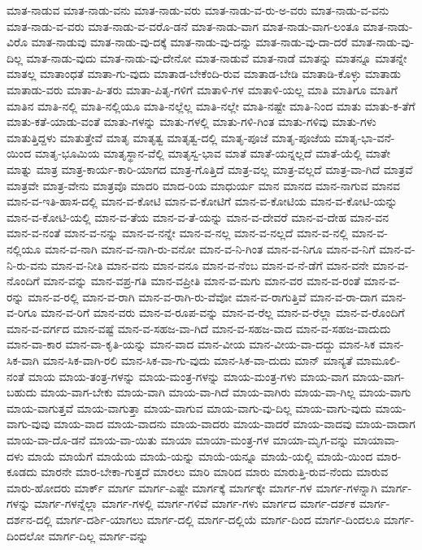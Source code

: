 {ಮಾತ-ನಾಡುವ
ಮಾತ-ನಾಡು-ವನು
ಮಾತ-ನಾಡು-ವರು
ಮಾತ-ನಾಡು-ವ-ರು-ಅ-ವರು
ಮಾತ-ನಾಡು-ವ-ವನು
ಮಾತ-ನಾಡು-ವ-ವರು
ಮಾತ-ನಾಡು-ವ-ವರೊ-ಡನೆ
ಮಾತ-ನಾಡು-ವಾಗ
ಮಾತ-ನಾಡು-ವಾಗ-ಲಂತೂ
ಮಾತ-ನಾಡು-ವಿರೊ
ಮಾತ-ನಾಡುವು
ಮಾತ-ನಾಡು-ವು-ದಕ್ಕೆ
ಮಾತ-ನಾಡು-ವು-ದನ್ನು
ಮಾತ-ನಾಡು-ವು-ದಾ-ದರೆ
ಮಾತ-ನಾಡು-ವು-ದಿಲ್ಲ
ಮಾತ-ನಾಡು-ವುದು
ಮಾತ-ನಾಡು-ವು-ದೇನೋ
ಮಾತ-ನಾಡುವೆ
ಮಾತ-ನಾಡೆ
ಮಾತನ್ನು
ಮಾತನ್ನೂ
ಮಾತನ್ನೇ
ಮಾತಲ್ಲ
ಮಾತಾಂಧತೆ
ಮಾತಾ-ಗು-ವುದು
ಮಾತಾಡ-ಬೇಕೆಂದಿ-ರುವ
ಮಾತಾಡ-ಬೇಡಿ
ಮಾತಾಡಿ-ಕೊಳ್ಳು
ಮಾತಾಡು
ಮಾತಾಡು-ವರು
ಮಾತಾ-ಪಿ-ತರು
ಮಾತಾ-ಪಿತೃ-ಗಳಿಗೆ
ಮಾತಾಳಿ-ಗಳ
ಮಾತಾಳಿ-ಯಲ್ಲ
ಮಾತಿ
ಮಾತಿಗೂ
ಮಾತಿಗೆ
ಮಾತಿನ
ಮಾತಿ-ನಲ್ಲಿ
ಮಾತಿ-ನಲ್ಲಿಯೂ
ಮಾತಿ-ನಲ್ಲೆಲ್ಲ
ಮಾತಿ-ನಲ್ಲೇ
ಮಾತಿ-ನಷ್ಟೇ
ಮಾತಿ-ನಿಂದ
ಮಾತು
ಮಾತು-ಕ-ತೆಗೆ
ಮಾತು-ಕತೆ-ಯಾಡು-ವಂತೆ
ಮಾತು-ಗಳನ್ನು
ಮಾತು-ಗಳಲ್ಲಿ
ಮಾತು-ಗಳಿ-ಗಿಂತ
ಮಾತು-ಗಳಿವು
ಮಾತು-ಗಳು
ಮಾತುತ್ತಿದ್ದಳು
ಮಾತುತ್ತೇವೆ
ಮಾತೃ
ಮಾತೃತ್ವ
ಮಾತೃತ್ವ-ದಲ್ಲಿ
ಮಾತೃ-ಪೂಜೆ
ಮಾತೃ-ಪೂಜೆಯ
ಮಾತೃ-ಭಾ-ವನೆ-ಯಿಂದ
ಮಾತೃ-ಭೂಮಿಯ
ಮಾತೃಸ್ಥಾನ-ವೆಲ್ಲಿ
ಮಾತೃಸ್ವ-ಭಾವ
ಮಾತೆ
ಮಾತೆ-ಯನ್ನಲ್ಲದೆ
ಮಾತೆ-ಯೆಲ್ಲಿ
ಮಾತೇ
ಮಾತ್ನು
ಮಾತ್ರ
ಮಾತ್ರ-ಕಾರ್ಯ-ಕಾರಿ-ಯಾಗದ
ಮಾತ್ರ-ಗೊತ್ತಿದೆ
ಮಾತ್ರ-ವಲ್ಲ
ಮಾತ್ರ-ವಲ್ಲದೆ
ಮಾತ್ರ-ವಾ-ಗಿದೆ
ಮಾತ್ರವೆ
ಮಾತ್ರವೇ
ಮಾತ್ರ-ವೇನು
ಮಾತ್ರವೊ
ಮಾದರಿ
ಮಾದ-ರಿಯ
ಮಾಧುರ್ಯ
ಮಾನ
ಮಾನದ
ಮಾನ-ನಾಗುವ
ಮಾನವ
ಮಾನ-ವ-ಇತಿ-ಹಾಸ-ದಲ್ಲಿ
ಮಾನ-ವ-ಕೋಟಿ
ಮಾನ-ವ-ಕೋಟಿಗೆ
ಮಾನ-ವ-ಕೋಟಿಯ
ಮಾನ-ವ-ಕೋಟಿ-ಯನ್ನು
ಮಾನ-ವ-ಕೋಟಿ-ಯಲ್ಲಿ
ಮಾನ-ವ-ತೆಯ
ಮಾನ-ವ-ತೆ-ಯನ್ನು
ಮಾನ-ವ-ದೇವರೆ
ಮಾನ-ವ-ದೇಹ
ಮಾನ-ವನ
ಮಾನ-ವ-ನಂತೆ
ಮಾನ-ವ-ನನ್ನು
ಮಾನ-ವ-ನನ್ನೇ
ಮಾನ-ವ-ನಲ್ಲ
ಮಾನ-ವ-ನಲ್ಲದೆ
ಮಾನ-ವ-ನಲ್ಲಿ
ಮಾನ-ವ-ನಲ್ಲಿಯೂ
ಮಾನ-ವ-ನಾಗಿ
ಮಾನ-ವ-ನಾಗಿ-ರು-ವನೋ
ಮಾನ-ವ-ನಿ-ಗಿಂತ
ಮಾನ-ವ-ನಿಗೂ
ಮಾನ-ವ-ನಿಗೆ
ಮಾನ-ವ-ನಿ-ರು-ವನು
ಮಾನ-ವ-ನೀತಿ
ಮಾನ-ವನು
ಮಾನ-ವನೂ
ಮಾನ-ವ-ನೆಂಬ
ಮಾನ-ವ-ನೆ-ಡೆಗೆ
ಮಾನ-ವನೇ
ಮಾನ-ವ-ನೊಂದಿಗೆ
ಮಾನ-ವನ್ನು
ಮಾನ-ವಪ್ರ-ಗತಿ
ಮಾನ-ವಪ್ರೀತಿ
ಮಾನ-ವ-ಮಗು
ಮಾನ-ವರ
ಮಾನ-ವ-ರಂತೆ
ಮಾನ-ವ-ರನ್ನು
ಮಾನ-ವ-ರಲ್ಲಿ
ಮಾನ-ವ-ರಾಗಿ
ಮಾನ-ವ-ರಾಗಿ-ರು-ವೆವೋ
ಮಾನ-ವ-ರಾಗುತ್ತಿವೆ
ಮಾನ-ವ-ರಾ-ದಾಗ
ಮಾನ-ವ-ರಿಗೂ
ಮಾನ-ವ-ರಿಗೆ
ಮಾನ-ವರು
ಮಾನ-ವ-ರೂಪ-ವನ್ನು
ಮಾನ-ವ-ರೆಲ್ಲ
ಮಾನ-ವ-ರೆಲ್ಲಾ
ಮಾನ-ವ-ರೊಂದಿಗೆ
ಮಾನ-ವ-ವರ್ಗದ
ಮಾನ-ವಷ್ಟೆ
ಮಾನ-ವ-ಸಹಜ-ವಾ-ಗಿದೆ
ಮಾನ-ವ-ಸಹಜ-ವಾದ
ಮಾನ-ವ-ಸಹಜ-ವಾದುದು
ಮಾನ-ವಾ-ಕಾರ
ಮಾನ-ವಾ-ಕೃತಿ-ಯನ್ನು
ಮಾನ-ವಾದ
ಮಾನ-ವೀಯ
ಮಾನ-ವೀಯ-ವಾ-ದದ್ದು
ಮಾನ-ಸಿಕ
ಮಾನ-ಸಿಕ-ವಾಗಿ
ಮಾನ-ಸಿಕ-ವಾಗಿ-ರಲಿ
ಮಾನ-ಸಿಕ-ವಾ-ಗು-ವುದು
ಮಾನ-ಸಿಕ-ವಾ-ದುದು
ಮಾನ್
ಮಾನ್ಯತೆ
ಮಾಮೂಲಿ-ನಂತೆ
ಮಾಯ
ಮಾಯ-ತಂತ್ರ-ಗಳನ್ನು
ಮಾಯ-ಮಂತ್ರ-ಗಳನ್ನು
ಮಾಯ-ಮಂತ್ರ-ಗಳು
ಮಾಯ-ವಾಗ
ಮಾಯ-ವಾಗ-ಬಹುದು
ಮಾಯ-ವಾಗ-ಬೇಕು
ಮಾಯ-ವಾಗಿ
ಮಾಯ-ವಾ-ಗಿದೆ
ಮಾಯ-ವಾಗಿರು
ಮಾಯ-ವಾ-ಗಿಲ್ಲ
ಮಾಯ-ವಾಗು
ಮಾಯ-ವಾಗುತ್ತವೆ
ಮಾಯ-ವಾಗುತ್ತಾ
ಮಾಯ-ವಾಗುವ
ಮಾಯ-ವಾಗು-ವು-ದಿಲ್ಲ
ಮಾಯ-ವಾಗು-ವುದು
ಮಾಯ-ವಾಗು-ವುವು
ಮಾಯ-ವಾದ
ಮಾಯ-ವಾದನು
ಮಾಯ-ವಾದರು
ಮಾಯ-ವಾದರೆ
ಮಾಯ-ವಾದವು
ಮಾಯ-ವಾದಾಗ
ಮಾಯ-ವಾ-ದೊ-ಡನೆ
ಮಾಯ-ವಾ-ಯಿತು
ಮಾಯಾ
ಮಾಯಾ-ಮಂತ್ರ-ಗಳ
ಮಾಯಾ-ಮೃಗ-ವನ್ನು
ಮಾಯಾವಾ-ದಳು
ಮಾಯೆ
ಮಾಯೆಗೆ
ಮಾಯೆಯ
ಮಾಯೆ-ಯನ್ನು
ಮಾಯೆ-ಯನ್ನೂ
ಮಾಯೆ-ಯಲ್ಲಿ
ಮಾಯೆ-ಯಿಂದ
ಮಾರ-ಕೂಡದು
ಮಾರನೇ
ಮಾರ-ಬೇಕಾ-ಗುತ್ತದೆ
ಮಾರಲು
ಮಾರಿ
ಮಾರಿದ
ಮಾರು
ಮಾರುತ್ತಿ-ರುವ-ನೆಂದು
ಮಾರುವ
ಮಾರು-ಹೋದರು
ಮಾರ್ಕ್
ಮಾರ್ಗ
ಮಾರ್ಗ-ಎಷ್ಟೇ
ಮಾರ್ಗಕ್ಕೆ
ಮಾರ್ಗಕ್ಕೇ
ಮಾರ್ಗ-ಗಳ
ಮಾರ್ಗ-ಗಳನ್ನಾಗಿ
ಮಾರ್ಗ-ಗಳನ್ನು
ಮಾರ್ಗ-ಗಳನ್ನೆಲ್ಲಾ
ಮಾರ್ಗ-ಗಳಲ್ಲಿ
ಮಾರ್ಗ-ಗಳಿವೆ
ಮಾರ್ಗ-ಗಳು
ಮಾರ್ಗದ
ಮಾರ್ಗ-ದರ್ಶಕ
ಮಾರ್ಗ-ದರ್ಶನ-ದಲ್ಲಿ
ಮಾರ್ಗ-ದರ್ಶಿ-ಯಾಗಲು
ಮಾರ್ಗ-ದಲ್ಲಿ
ಮಾರ್ಗ-ದಲ್ಲಿಯೆ
ಮಾರ್ಗ-ದಿಂದ
ಮಾರ್ಗ-ದಿಂದಲೂ
ಮಾರ್ಗ-ದಿಂದಲೋ
ಮಾರ್ಗ-ದಿಲ್ಲ
ಮಾರ್ಗ-ವನ್ನು
}
